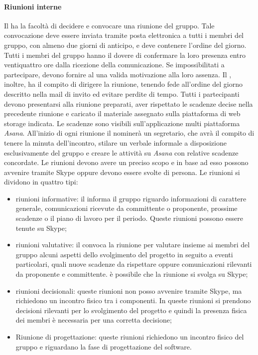 			\paragraph{Riunioni interne}
			Il \textit{\RdP} ha la facoltà di decidere e convocare una riunione del gruppo. Tale convocazione deve essere inviata tramite posta elettronica a tutti i membri del gruppo, con almeno due giorni di anticipo, e deve contenere l'ordine del giorno. Tutti i membri del gruppo hanno il dovere di confermare la loro presenza entro ventiquattro ore dalla ricezione della comunicazione. Se impossibilitati a partecipare, devono fornire al \textit{\RdP} una valida motivazione alla loro assenza. Il \textit{\RdP}, inoltre, ha il compito di dirigere la riunione, tenendo fede all'ordine del giorno descritto nella mail di invito ed evitare perdite di tempo. Tutti i partecipanti devono presentarsi alla riunione preparati, aver rispettato le scadenze decise nella precedente riunione e caricato il materiale assegnato sulla piattaforma di web storage indicata. Le scadenze sono visibili sull'applicazione multi piattaforma \textit{Asana}.
			All’inizio di ogni riunione il \textit{\RdP} nominerà un segretario, che avrà il compito di tenere la minuta dell'incontro, stilare un verbale informale a disposizione esclusivamente del gruppo e creare le attività su \textit{Asana} con relative scadenze concordate.  
			Le riunioni devono avere un preciso scopo e in base ad esso possono avvenire tramite Skype oppure devono essere svolte di persona. Le riunioni si dividono in quattro tipi:
			\begin{itemize}
				\item riunioni informative: il \RdP informa il gruppo riguardo informazioni di carattere generale, comunicazioni ricevute da committente o proponente, prossime scadenze o il piano di lavoro per il periodo. Queste riunioni possono essere tenute su Skype;
				\item riunioni valutative: il \RdP convoca la riunione per valutare insieme ai membri del gruppo alcuni aspetti dello svolgimento del progetto in seguito a eventi particolari, quali nuove scadenze da rispettare oppure comunicazioni rilevanti da proponente e committente. è possibile che la riunione si svolga su Skype;
				\item riunioni decisionali: queste riunioni non posso avvenire tramite Skype, ma richiedono un incontro fisico tra i componenti. In queste riunioni si prendono decisioni rilevanti per lo svolgimento del progetto e quindi la presenza fisica dei membri è necessaria per una corretta decisione;
				\item Riunione di progettazione: queste riunioni richiedono un incontro fisico del gruppo e riguardano la fase di progettazione del software. 
			\end{itemize}
		
